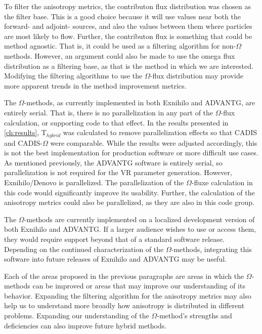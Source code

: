 To filter the anisotropy metrics, the contributon flux distribution was chosen
as the filter base. This is a good choice because it will use values near both
the forward- and adjoint- sources, and also the values between them where
particles are most likely to flow. Further, the contributon flux is something
that could be method agnostic. That is, it could be used as a filtering
algorithm for non-$\Omega$ methods. However, an argument could also be made to
use the omega flux distribution as a filtering base, as that is the method in
which we are interested. Modifying the filtering algorithms to use the
$\Omega$-flux distribution may provide more apparent trends in the method
improvement metrics.

The $\Omega$-methods, as currently implemented in both Exnihilo and ADVANTG, are
entirely serial. That is, there is no parallelization in any part of the
$\Omega$-flux calculation, or supporting code to that effect. In the results
presented in \ref{ch:results}, T$_{hybrid}$ was calculated to remove
parallelization effects so that CADIS and CADIS-$\Omega$ were comparable. While
the results were adjusted accordingly, this is not the best implementation for
production software or more difficult use cases. As mentioned previously, the
ADVANTG software is entirely serial, so parallelization is not required for the
VR parameter generation. However, Exnihilo/Denovo is parallelized. The
parallelization of the $\Omega$-fluxe calculation in this code would significantly improve its
usability. Further, the calculation of the anisotropy metrics could also be
parallelized, as they are also in this code group.

The $\Omega$-methods are currently implemented on a localized
development version of both Exnihilo and ADVANTG. If a larger audience wishes to
use or access them, they would require support beyond that of a standard
software release. Depending on the continued characterization of the
$\Omega$-methods, integrating this software into future releases of Exnihilo and
ADVANTG may be useful.

Each of the areas proposed in the previous paragraphs are areas in which the
$\Omega$-methods can be improved or areas that may improve our understanding of
its behavior. Expanding the filtering algorithm for the anisotropy metrics may
also help us to understand more broadly how anisotropy is distributed in
different problems. Expanding our understanding of the $\Omega$-method's
strengths and deficiencies can also improve future hybrid methods.

